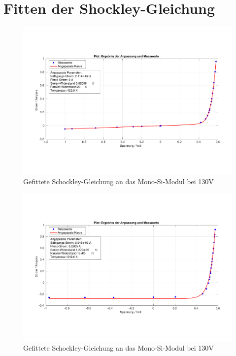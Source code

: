 \clearpage
\section{Fitten der Shockley-Gleichung}

\begin{figure}[ht]
    \centering
    \includegraphics[width = \linewidth]{Bilder/SiMonoDunkelPlot.pdf}
    \caption{Gefittete Schockley-Gleichung an das Mono-Si-Modul bei 130V}
\end{figure}
\begin{figure}[ht]
    \centering
    \includegraphics[width = \linewidth]{Bilder/SiMulti130Plot.pdf}
    \caption{Gefittete Schockley-Gleichung an das Mono-Si-Modul bei 130V}
\end{figure}
